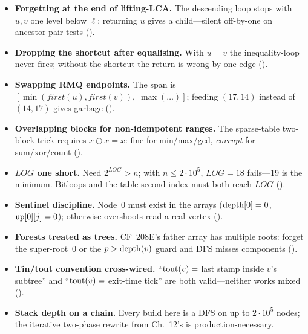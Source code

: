 \begin{itemize}[nosep, leftmargin=1.4em]
  \item \textbf{Forgetting  at the end of
        lifting-LCA.} The descending loop stops with \(u,v\) one level
        below \(\ell\); returning \(u\) gives a child---silent off-by-one
        on ancestor-pair tests ().
  \item \textbf{Dropping the  shortcut after
        equalising.} With \(u=v\) the inequality-loop never fires;
        without the shortcut the  return is wrong by one edge
        ().
  \item \textbf{Swapping RMQ endpoints.} The span is
        \([\min(\mathit{first}(u),\mathit{first}(v)),\;
         \max(\ldots)]\); feeding \((17,14)\) instead of \((14,17)\)
        gives garbage ().
  \item \textbf{Overlapping blocks for non-idempotent ranges.} The
        sparse-table two-block trick requires \(x \oplus x = x\): fine
        for min/max/gcd, \emph{corrupt} for sum/xor/count
        ().
  \item \textbf{\(\mathit{LOG}\) one short.} Need \(2^{\mathit{LOG}} >
        n\); with \(n \le 2\cdot10^{5}\), \(\mathit{LOG}=18\) fails---19
        is the minimum. Bitloops and the table second index must both
        reach \(\mathit{LOG}\) ().
  \item \textbf{Sentinel discipline.} Node~0 must exist in the arrays
        (\(\operatorname{depth}[0]=0\), \(\texttt{up}[0][j]=0\)); otherwise overshoots
        read a real vertex ().
  \item \textbf{Forests treated as trees.} CF~208E's father array has
        multiple roots: forget the super-root~0 or the \(p > \operatorname{depth}(v)\)
        guard and DFS misses components ().
  \item \textbf{Tin/tout convention cross-wired.} ``\(\operatorname{tout}(v) =\) last
        stamp inside \(v\)'s subtree'' and ``\(\operatorname{tout}(v) =\) exit-time
        tick'' are both valid---neither works mixed
        ().
  \item \textbf{Stack depth on a chain.} Every build here is a DFS on
        up to \(2\cdot10^{5}\) nodes; the iterative two-phase rewrite
        from Ch.~12's  is production-necessary.
\end{itemize}


